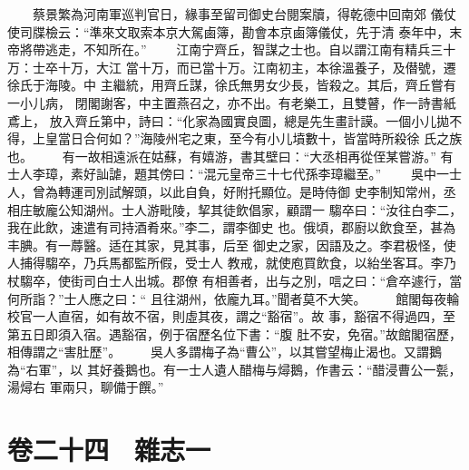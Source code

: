 \documentclass{ctexart}
\begin{document}
　　蔡景繁為河南軍巡判官日，緣事至留司御史台閱案牘，得乾德中回南郊 儀仗使司牒檢云：``準來文取索本京大駕鹵簿，勘會本京鹵簿儀仗，先于清 泰年中，末帝將帶逃走，不知所在。'' 　　江南宁齊丘，智謀之士也。自以謂江南有精兵三十万：士卒十万，大江 當十万，而已當十万。江南初主，本徐溫養子，及僣號，遷徐氏于海陵。中 主繼統，用齊丘謀，徐氏無男女少長，皆殺之。其后，齊丘嘗有一小儿病， 閉閣謝客，中主置燕召之，亦不出。有老樂工，且雙瞽，作一詩書紙鳶上， 放入齊丘第中，詩曰：``化家為國實良圖，總是先生畫計謨。一個小儿拋不 得，上皇當日合何如？''海陵州宅之東，至今有小儿墳數十，皆當時所殺徐 氏之族也。 　　有一故相遠派在姑蘇，有嬉游，書其壁曰：``大丞相再從侄某嘗游。'' 有士人李璋，素好訕謔，題其傍曰：``混元皇帝三十七代孫李璋繼至。'' 　　吳中一士人，曾為轉運司別試解頭，以此自負，好附托顯位。是時侍御 史李制知常州，丞相庄敏龐公知湖州。士人游毗陵，挈其徒飲倡家，顧謂一 騶卒曰：``汝往白李二，我在此飲，速遣有司持酒肴來。''李二，謂李御史 也。俄頃，郡廚以飲食至，甚為丰腆。有一蓐醫。适在其家，見其事，后至 御史之家，因語及之。李君极怪，使人捕得騶卒，乃兵馬都監所假，受士人 教戒，就使庖買飲食，以紿坐客耳。李乃杖騶卒，使街司白士人出城。郡僚 有相善者，出与之別，唁之曰：``倉卒遽行，當何所詣？''士人應之曰：`` 且往湖州，依龐九耳。''聞者莫不大笑。 　　館閣每夜輪校官一人直宿，如有故不宿，則虛其夜，謂之``豁宿''。故 事，豁宿不得過四，至第五日即須入宿。遇豁宿，例于宿歷名位下書：``腹 肚不安，免宿。''故館閣宿歷，相傳謂之``害肚歷''。 　　吳人多謂梅子為``曹公''，以其嘗望梅止渴也。又謂鵝為``右軍''，以 其好養鵝也。有一士人遺人醋梅与燖鵝，作書云：``醋浸曹公一甏，湯燖右 軍兩只，聊備于饌。''
\clearpage
\section{卷二十四　雜志一}
\end{document}
